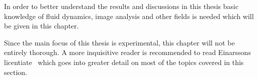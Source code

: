 In order to better understand the results and discussions in this thesis basic knowledge of fluid dynamics, image analysis and other fields is needed which will be given in this chapter. 

Since the main focus of this thesis is experimental, this chapter will not be entirely thorough. A more inquisitive reader is recommended to read Einarssons licentiate~\cite{JonasLic} which goes into greater detail on most of the topics covered in this section.